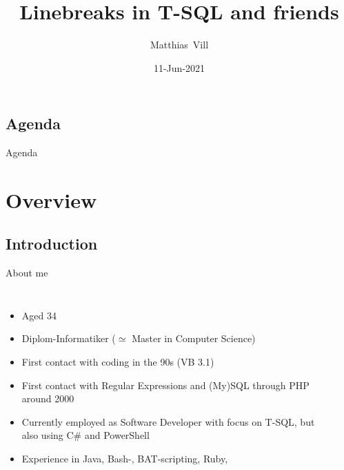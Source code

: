 \documentclass[english,aspectratio=169]{beamer}
\title[Linebreaks in T-SQL and friends]{Linebreaks in T-SQL and friends}
\author[M. Vill]{Matthias~Vill}
\institute[DM 2021]{Data Minutes 2021}
\date{11-Jun-2021}
\begin{document}
\frame{\maketitle}


\subsection*{Agenda}
\begin{frame}{Agenda}
    \tableofcontents%
\end{frame}

\section{Overview}

\subsection{Introduction}
\begin{frame}{About me}
\begin{columns}
        \begin{itemize}
            \item Aged 34
            \item Diplom-Informatiker ($\simeq$ Master in Computer Science)
            \item First contact with coding in the 90s (VB 3.1)
            \item First contact with Regular Expressions and (My)SQL through PHP around 2000
            \item Currently employed as Software Developer with focus on T-SQL, but also using C\# and PowerShell
            \item Experience in Java, Bash-, BAT-scripting, Ruby, \textellipsis
        \end{itemize}
        \begin{center}
            \hyperlink{https://www.youracclaim.com/badges/bd81bbb0-8416-40b7-bede-77e7f2b0d5cf}{ }
        \end{center}
        \begin{center}
        \end{center}
    \end{columns}
\end{frame}
\end{document}
